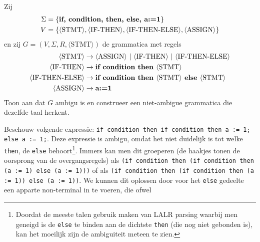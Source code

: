 \documentclass[a4paper]{article}
\newcommand{\rul}{\rightarrow}
\newcommand{\gvar}[1]{\langle \text{{#1}} \rangle}
\newcommand{\gend}[1]{\text{\bf{#1}}}
\begin{document}
\begin{question}
Zij 
\begin{align*}
  \Sigma & = \{ \gend{if, condition, then, else, a:=1} \} \\
  V & = \{ \gvar{STMT}, \gvar{IF-THEN}, \gvar{IF-THEN-ELSE}, \gvar{ASSIGN} \} \\
\end{align*}
  en zij $G = (V,\Sigma,R,\gvar{STMT})$ de grammatica met regels
  \begin{align*}                                                                               
      \gvar{STMT}          & \rul \gvar{ASSIGN} \ | \ \gvar{IF-THEN} \ | \ \gvar{IF-THEN-ELSE}  \\
      \gvar{IF-THEN}       & \rul \gend{if condition then } \gvar{STMT} \\
      \gvar{IF-THEN-ELSE}  & \rul \gend{if condition then } \gvar{STMT} \gend{ else } \gvar{STMT} \\
      \gvar{ASSIGN}        & \rul \gend{a:=1} \\
  \end{align*}
  Toon aan dat $G$ ambigu is en construeer een niet-ambigue grammatica die dezelfde taal herkent.
\begin{answer}
Beschouw volgende expressie: \texttt{if condition then if condition then a := 1; else a := 1;}. Deze expressie is ambigu, omdat het niet duidelijk is tot welke \texttt{then}, de \texttt{else} behoort\footnote{Doordat de meeste talen gebruik maken van LALR parsing waarbij men geneigd is de \texttt{else} te binden aan de dichtste \texttt{then} (die nog niet gebonden is), kan het moeilijk zijn de ambiguiteit meteen te zien.}. Immers kan men dit groeperen (de haakjes tonen de oorsprong van de overgangsregels) als \texttt{(if condition then (if condition then (a := 1) else (a := 1)))} of als \texttt{(if condition then (if condition then (a := 1)) else (a := 1))}. We kunnen dit oplossen door voor het \texttt{else} gedeelte een apparte non-terminal in te voeren, die ofwel 
\end{answer}
\end{question}
\end{document}
